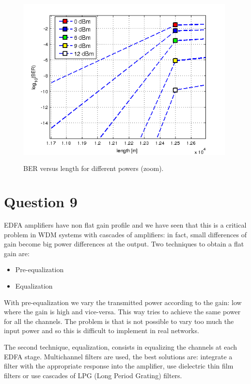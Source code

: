 \documentclass[a4paper,10pt]{report}
\begin{document}
\begin{figure}[!ht]
   \centering
   \includegraphics[width=11cm]{exercise6zoom.png}\\
   \caption{BER versus length for different powers (zoom).}
   \label{exercise6zoom}
\end{figure}


\newpage
\section*{Question 9}
EDFA amplifiers have non flat gain profile and we have seen that this is a critical problem in WDM systems with cascades of amplifiers:
in fact, small differences of gain become big power differences at the output.
Two techniques to obtain a flat gain are:
\begin{itemize}
 \item Pre-equalization
 \item Equalization
\end{itemize}

With pre-equalization we vary the transmitted power according to the gain: low where the gain is high and vice-versa.
This way tries to achieve the same power for all the channels. The problem is that is not possible to vary too much the input power
and so this is difficult to implement in real networks.

The second technique, equalization, consists in equalizing the channels at each EDFA stage. Multichannel filters are used, the best
solutions are: integrate a filter with the appropriate response into the amplifier, use dielectric thin film filters or use cascades
of LPG (Long Period Grating) filters.
\end{document}
